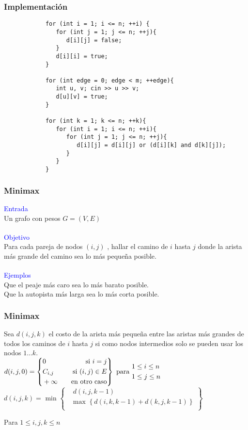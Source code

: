 \documentclass{beamer}
\begin{document}
	\begin{frame}[fragile]
		\frametitle{Implementación}
		\begin{lstlisting}
			for (int i = 1; i <= n; ++i) {
			   for (int j = 1; j <= n; ++j){
			      d[i][j] = false;
			   }
			   d[i][i] = true;
			}

			for (int edge = 0; edge < m; ++edge){
			   int u, v; cin >> u >> v;
			   d[u][v] = true;
			}
			
			for (int k = 1; k <= n; ++k){
			   for (int i = 1; i <= n; ++i){
			      for (int j = 1; j <= n; ++j){
			         d[i][j] = d[i][j] or (d[i][k] and d[k][j]);
			      }
			   }
			}
		\end{lstlisting}
	\end{frame}
	
	\begin{frame}
		\frametitle{Minimax}
		\textcolor{blue}{\large Entrada}\\
		Un grafo con pesos $G = (V, E)$ \\ \quad \\
		\textcolor{blue}{\large Objetivo}\\
		Para cada pareja de nodos $(i, j)$ , hallar el camino de $i$ hasta $j$ donde la arista más grande del camino sea lo más pequeña posible.\\ \quad \\
		\textcolor{blue}{\large Ejemplos}\\
		Que el peaje más caro sea lo más barato posible.\\
		Que la autopista más larga sea lo más corta posible.
	\end{frame}
	
	\begin{frame}
		\frametitle{Minimax}
		Sea $d(i, j, k)$ el costo de la arista más pequeña entre las aristas más grandes de todos los caminos de $i$ hasta $j$ si como nodos intermedios solo se pueden usar los nodos $1 \ldots k$. \\
		\vfill
		$d(i, j, 0) =
		\left\{
			\begin{aligned}
				& 0       &\text{\quad si } i = j\\
				& C_{i,j} &\text{\quad si } (i, j) \in E\\
				& +\infty &\text{\quad en otro caso}
			\end{aligned}
		\right\}
		\text{ para } 
			\begin{aligned}
				& 1 \leq i \leq n\\
				& 1 \leq j \leq n\\
			\end{aligned}
		$
		\vfill
		$d(i, j, k) = \text{ min }
		\left\{
			\begin{aligned}
				& d(i, j, k-1)\\
				& \text{max }\left\{ d(i, k, k-1) + d(k, j, k-1) \right\}\\
			\end{aligned}
		\right\}
		$
		\\ \begin{center} Para $ 1 \leq i, j, k \leq n$ \end{center}
	\end{frame}
	
\end{document}
